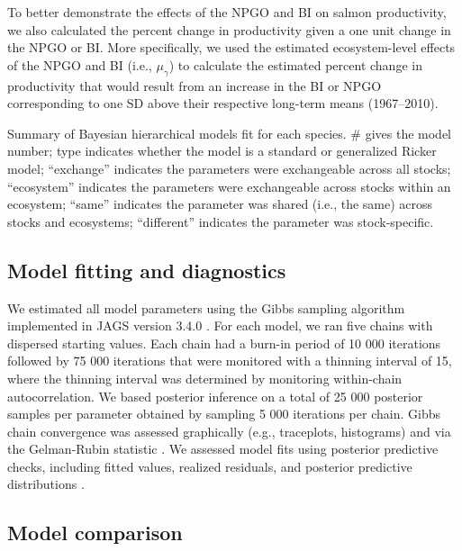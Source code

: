 To better demonstrate the effects of the NPGO and BI on salmon productivity, we
also calculated the percent change in productivity given a one unit change in
the NPGO or BI. More specifically, we used the estimated ecosystem-level effects
of the NPGO and BI (i.e., \(\mu_{\gamma}\)) to calculate the estimated percent
change in productivity that would result from an increase in the BI or NPGO
corresponding to one SD above their respective long-term means (1967--2010).

\begin{table}[htbp]
  \small \centering \libertineLF
  \caption[Summary of Bayesian hierarchical models fit for each
           species]{Summary of Bayesian hierarchical models fit for each
           species. \# gives the model number; type indicates whether the
           model is a standard or generalized Ricker model; ``exchange''
           indicates the parameters were exchangeable across all stocks;
           ``ecosystem'' indicates the parameters were exchangeable across
           stocks within an ecosystem; ``same'' indicates the parameter was
           shared (i.e., the same) across stocks and ecosystems; ``different''
           indicates the parameter was stock-specific.}
  
  \label{tab:npc:1}
\end{table}


\subsection{Model fitting and diagnostics}

We estimated all model parameters using the Gibbs sampling algorithm implemented
in JAGS version 3.4.0 \citep{Plummer2003}. For each model, we ran five chains
with dispersed starting values. Each chain had a burn-in period of 10 000
iterations followed by 75 000 iterations that were monitored with a thinning
interval of 15, where the thinning interval was determined by monitoring
within-chain autocorrelation. We based posterior inference on a total of 25 000
posterior samples per parameter obtained by sampling 5 000 iterations per chain.
Gibbs chain convergence was assessed graphically (e.g., traceplots, histograms)
and via the Gelman-Rubin statistic \citep{Gelman1992, Brooks1998}. We assessed
model fits using posterior predictive checks, including fitted values, realized
residuals, and posterior predictive distributions \citep{Gelman2004a}.


\subsection{Model comparison}

